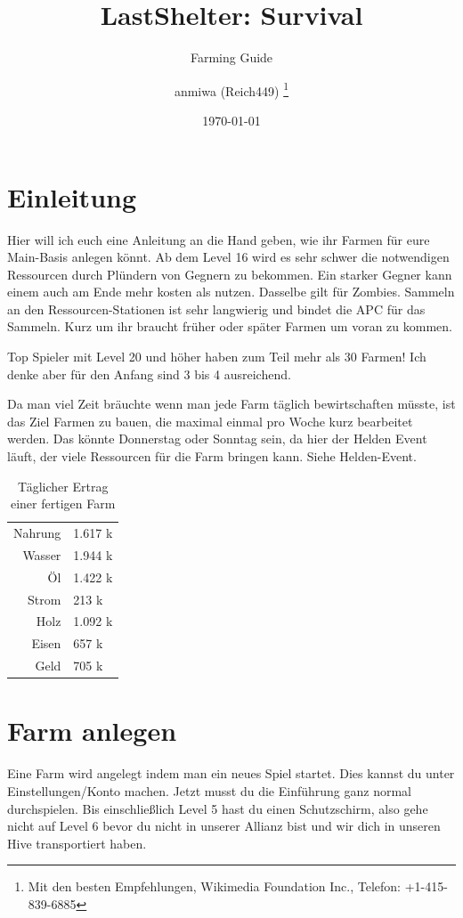 \documentclass[fontsize=12pt,a4paper,draft]{scrartcl}[2003/01/01]
\title{LastShelter: Survival}
\subtitle{Farming Guide}
\author{\textcopyleft{} anmiwa (Reich449)%
  \thanks{Mit den besten Empfehlungen,
    Wikimedia Foundation Inc.,
    Telefon: +1-415-839-6885}}
\date{\today}               %
\begin{document}
\maketitle                  %
\tableofcontents            %

\listoffigures

\section{Einleitung}
Hier will ich euch eine Anleitung an die Hand geben, wie ihr Farmen für eure Main-Basis anlegen könnt. Ab dem Level 16 wird es sehr schwer die notwendigen Ressourcen durch Plündern von Gegnern zu bekommen. Ein starker Gegner kann einem auch am Ende mehr kosten als nutzen.
Dasselbe gilt für Zombies. Sammeln an den Ressourcen-Stationen ist sehr langwierig und bindet die APC für das Sammeln. Kurz um ihr braucht früher oder später Farmen um voran zu kommen.

Top Spieler mit Level 20 und höher haben zum Teil mehr als 30 Farmen! Ich denke aber für den Anfang sind 3 bis 4 ausreichend.

Da man viel Zeit bräuchte wenn man jede Farm täglich bewirtschaften müsste, ist das Ziel Farmen zu bauen, die maximal einmal pro Woche kurz bearbeitet werden. Das könnte Donnerstag oder Sonntag sein, da hier der Helden Event läuft, der viele Ressourcen für die Farm bringen kann. Siehe Helden-Event.

\begin{table}[h!]
  \centering
    \caption[Ertrag]{Täglicher Ertrag einer fertigen Farm}
    \begin{tabular}{rl}
      Nahrung & 1.617 k \\
      Wasser & 1.944 k \\
      Öl & 1.422 k \\
      Strom & 213 k \\
      Holz & 1.092 k \\
      Eisen & 657 k \\
      Geld & 705 k \\
    \end{tabular}
\end{table}

\section{Farm anlegen}
Eine Farm wird angelegt indem man ein neues Spiel startet. Dies kannst du unter Einstellungen/Konto machen.
Jetzt musst du die Einführung ganz normal durchspielen. Bis einschließlich Level 5 hast du einen Schutzschirm, also gehe nicht auf Level 6 bevor du nicht in unserer Allianz bist und wir dich in unseren Hive transportiert haben.
\end{document}
